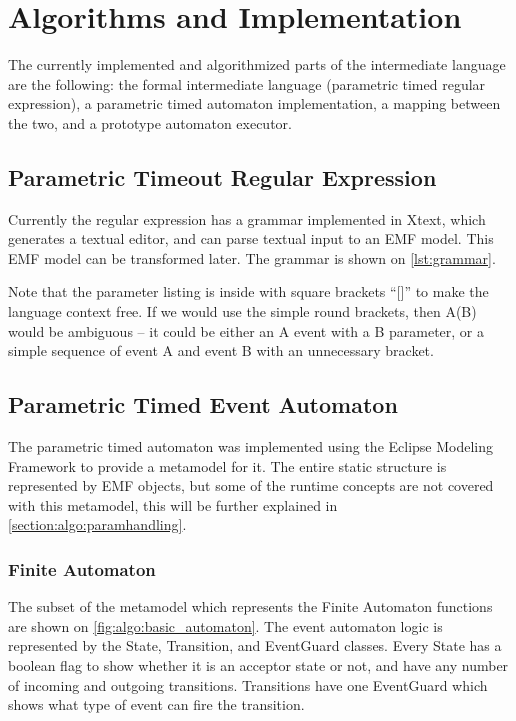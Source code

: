 \chapter{Algorithms and Implementation}

The currently implemented and algorithmized parts of the intermediate language are the following: the formal intermediate language (parametric timed regular expression), a parametric timed automaton implementation, a mapping between the two, and a prototype automaton executor.

\section{Parametric Timeout Regular Expression}

Currently the regular expression has a grammar implemented in Xtext, which generates a textual editor, and can parse textual input to an EMF model. This EMF model can be transformed later. 
The grammar is shown on \cref{lst:grammar}. %

Note that the parameter listing is inside with square brackets ``[]'' to make the language context free. If we would use the simple round brackets, then A(B) would be ambiguous -- it could be either an A event with a B parameter, or a simple sequence of event A and event B with an unnecessary bracket.

\section{Parametric Timed Event Automaton}

The parametric timed automaton was implemented using the Eclipse Modeling Framework to provide a metamodel for it. The entire static structure is represented by EMF objects, but some of the runtime concepts are not covered with this metamodel, this will be further explained in \cref{section:algo:paramhandling}.

\subsection{Finite Automaton}

The subset of the metamodel which represents the Finite Automaton functions are shown on \cref{fig:algo:basic_automaton}.
The event automaton logic is represented by the State, Transition, and EventGuard classes.
Every State has a boolean flag to show whether it is an acceptor state or not, and have any number of incoming and outgoing transitions.
Transitions have one EventGuard which shows what type of event can fire the transition. 

